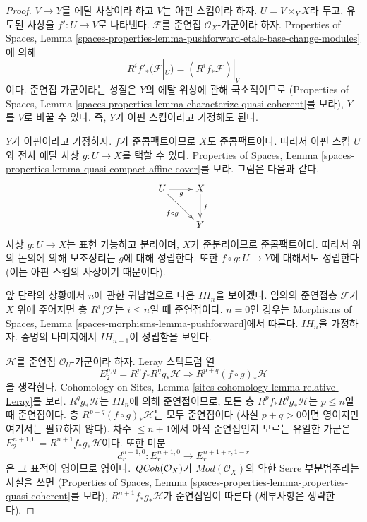 \begin{proof}
$V \to Y$를 에탈 사상이라 하고 $V$는 아핀 스킴이라 하자.
$U = V \times_Y X$라 두고,
유도된 사상을 $f' : U \to V$로 나타낸다.
$\mathcal{F}$를 준연접 $\mathcal{O}_X$-가군이라 하자.
Properties of Spaces, Lemma
\ref{spaces-properties-lemma-pushforward-etale-base-change-modules}에 의해
$$
R^if'_*(\mathcal{F}|_U) = (R^if_*\mathcal{F})|_V
$$
이다. 준연접 가군이라는 성질은 $Y$의 에탈 위상에 관해 국소적이므로
(Properties of Spaces, Lemma
\ref{spaces-properties-lemma-characterize-quasi-coherent}를 보라),
$Y$를 $V$로 바꿀 수 있다. 즉, $Y$가 아핀 스킴이라고 가정해도 된다.

\medskip\noindent
$Y$가 아핀이라고 가정하자. $f$가 준콤팩트이므로 $X$도 준콤팩트이다.
따라서 아핀 스킴 $U$와 전사 에탈 사상 $g : U \to X$를 택할 수 있다.
Properties of Spaces, Lemma
\ref{spaces-properties-lemma-quasi-compact-affine-cover}를 보라.
그림은 다음과 같다.
$$
\xymatrix{
U \ar[r]_g \ar[rd]_{f \circ g} & X \ar[d]^f \\
& Y
}
$$
사상 $g : U \to X$는 표현 가능하고 분리이며,
$X$가 준분리이므로 준콤팩트이다. 따라서 위의 논의에 의해 보조정리는
$g$에 대해 성립한다. 또한 $f \circ g : U \to Y$에 대해서도 성립한다
(이는 아핀 스킴의 사상이기 때문이다).

\medskip\noindent
앞 단락의 상황에서 $n$에 관한 귀납법으로 다음 $IH_n$을 보이겠다.
임의의 준연접층 $\mathcal{F}$가 $X$ 위에 주어지면 층
$R^if\mathcal{F}$는 $i \leq n$일 때 준연접이다.
$n = 0$인 경우는 Morphisms of Spaces, Lemma
\ref{spaces-morphisms-lemma-pushforward}에서 따른다.
$IH_n$을 가정하자. 증명의 나머지에서 $IH_{n + 1}$이 성립함을 보인다.

\medskip\noindent
$\mathcal{H}$를 준연접 $\mathcal{O}_U$-가군이라 하자.
Leray 스펙트럼 열
$$
E_2^{p, q} = R^pf_* R^qg_* \mathcal{H}
\Rightarrow
R^{p + q}(f \circ g)_*\mathcal{H}
$$
을 생각한다. Cohomology on Sites, Lemma
\ref{sites-cohomology-lemma-relative-Leray}를 보라.
$R^qg_*\mathcal{H}$는 $IH_n$에 의해 준연접이므로,
모든 층 $R^pf_*R^qg_*\mathcal{H}$는 $p \leq n$일 때 준연접이다.
층 $R^{p + q}(f \circ g)_*\mathcal{H}$는 모두 준연접이다
(사실 $p + q > 0$이면 영이지만 여기서는 필요하지 않다).
차수 $\leq n + 1$에서 아직 준연접인지 모르는 유일한 가군은
$E_2^{n + 1, 0} = R^{n + 1}f_*g_*\mathcal{H}$이다.
또한 미분
$$
d_r^{n + 1, 0} : E_r^{n + 1, 0} \to E_r^{n + 1 + r, 1 - r}
$$
은 그 표적이 영이므로 영이다.
$\mathit{QCoh}(\mathcal{O}_X)$가 $\textit{Mod}(\mathcal{O}_X)$의 약한
Serre 부분범주라는 사실을 쓰면
(Properties of Spaces, Lemma
\ref{spaces-properties-lemma-properties-quasi-coherent}를 보라),
$R^{n + 1}f_*g_*\mathcal{H}$가 준연접임이 따른다
(세부사항은 생략한다).


\end{proof}
